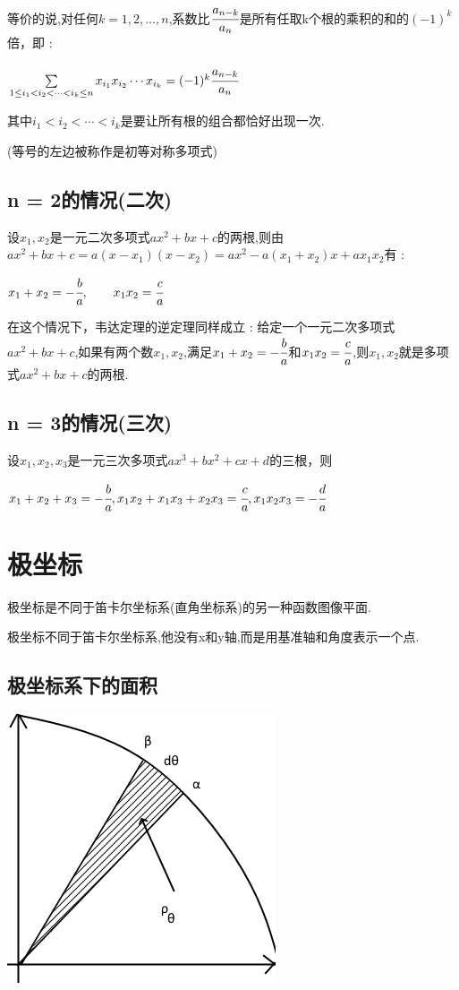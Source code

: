 {{{等价的说,对任何$k = 1,2,\dots,n$,系数比$\cfrac{a_{n-k}}{a_n}$是所有任取k个根的乘积的和的$(-1)^k$倍，即 :

$\sum\limits_{1 \leq i_1 < i_2 < \dotsm < i_k \leq n}x_{i_{1}}x_{i_{2}} \dotsm x_{i_{k}} = (-1)^k\cfrac{a_{n-k}}{a_n}$

其中$i_1 < i_2 < \dotsm < i_k$是要让所有根的组合都恰好出现一次.

(等号的左边被称作是初等对称多项式)
}%

\subsection{n = 2的情况(二次)}{
    设$x_1,x_2$是一元二次多项式$ax^2 + bx + c$的两根,则由$ax^2 +bx + c = a(x - x_1)(x - x_2) = ax^2 - a(x_1 + x_2)x + ax_1x_2$有 :

    $x_1 + x_2 = -\cfrac{b}{a},\qquad x_1x_2 = \cfrac{c}{a}$

    在这个情况下，韦达定理的逆定理同样成立 : 给定一个一元二次多项式$ax^2 + bx + c$,如果有两个数$x_1,x_2$,满足$x_1 + x_2 = -\cfrac{b}{a}$和$x_1x_2 = \cfrac{c}{a}$,则$x_1,x_2$就是多项式$ax^2 + bx + c$的两根.
}%

\subsection{n = 3的情况(三次)}{
    设$x_1,x_2,x_3$是一元三次多项式$ax^3 + bx^2 + cx + d$的三根，则

    $x_1 + x_2 + x_3 = -\cfrac{b}{a}, x_1x_2 + x_1x_3 + x_2x_3 = \cfrac{c}{a},x_1x_2x_3 = -\cfrac{d}{a}$
}%

}%

\section{极坐标}{
极坐标是不同于笛卡尔坐标系(直角坐标系)的另一种函数图像平面.

极坐标不同于笛卡尔坐标系,他没有x和y轴,而是用基准轴和角度表示一个点.

\subsection{极坐标系下的面积}{
    \begin{center}
        \includegraphics{resources/polar_coordness.png}
    \end{center}

}}}
